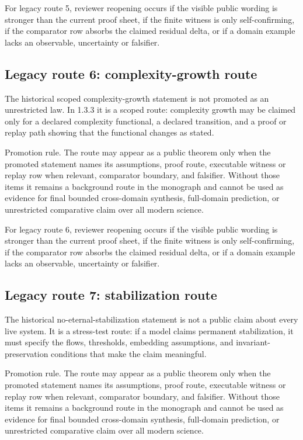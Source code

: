 For legacy route 5, reviewer reopening occurs if the visible public wording is stronger than the current proof sheet, if the finite witness is only self-confirming, if the comparator row absorbs the claimed residual delta, or if a domain example lacks an observable, uncertainty or falsifier.


\subsection{Legacy route 6: complexity-growth route}

The historical scoped complexity-growth statement is not promoted as an unrestricted law. In 1.3.3 it is a scoped route: complexity growth may be claimed only for a declared complexity functional, a declared transition, and a proof or replay path showing that the functional changes as stated.


Promotion rule. The route may appear as a public theorem only when the promoted statement names its assumptions, proof route, executable witness or replay row when relevant, comparator boundary, and falsifier. Without those items it remains a background route in the monograph and cannot be used as evidence for final bounded cross-domain synthesis, full-domain prediction, or unrestricted comparative claim over all modern science.


For legacy route 6, reviewer reopening occurs if the visible public wording is stronger than the current proof sheet, if the finite witness is only self-confirming, if the comparator row absorbs the claimed residual delta, or if a domain example lacks an observable, uncertainty or falsifier.


\subsection{Legacy route 7: stabilization route}

The historical no-eternal-stabilization statement is not a public claim about every live system. It is a stress-test route: if a model claims permanent stabilization, it must specify the flows, thresholds, embedding assumptions, and invariant-preservation conditions that make the claim meaningful.


Promotion rule. The route may appear as a public theorem only when the promoted statement names its assumptions, proof route, executable witness or replay row when relevant, comparator boundary, and falsifier. Without those items it remains a background route in the monograph and cannot be used as evidence for final bounded cross-domain synthesis, full-domain prediction, or unrestricted comparative claim over all modern science.


